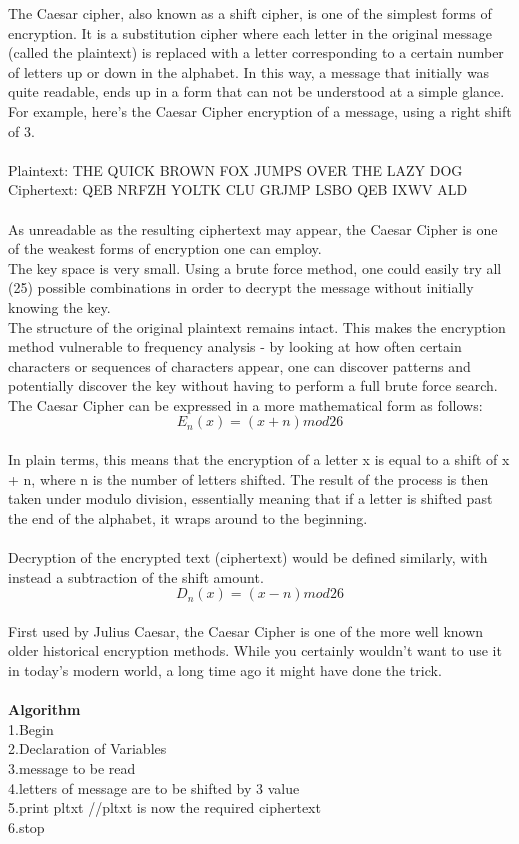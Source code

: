 \documentclass[11pt]{article}
\begin{document}
The Caesar cipher, also known as a shift cipher, is one of the simplest forms of encryption. It is a substitution cipher where each letter in the original message (called the plaintext) is replaced with a letter corresponding to a certain number of letters up or down in the alphabet.
In this way, a message that initially was quite readable, ends up in a form that can not be understood at a simple glance.
For example, here's the Caesar Cipher encryption of a message, using a right shift of 3.
\\
\\
Plaintext:  
THE QUICK BROWN FOX JUMPS OVER THE LAZY DOG
Ciphertext: 
QEB NRFZH YOLTK CLU GRJMP LSBO QEB IXWV ALD
\\
\\
As unreadable as the resulting ciphertext may appear, the Caesar Cipher is one of the weakest forms of encryption one can employ.
\\
The key space is very small. Using a brute force method, one could easily try all (25) possible combinations in order to decrypt the message without initially knowing the key.
\\
The structure of the original plaintext remains intact. This makes the encryption method vulnerable to frequency analysis - by looking at how often certain characters or sequences of characters appear, one can discover patterns and potentially discover the key without having to perform a full brute force search.
\\
The Caesar Cipher can be expressed in a more mathematical form as follows:
$$E_n(x)=(x+n)mod26$$
\\
In plain terms, this means that the encryption of a letter x is equal to a shift of x + n, where n is the number of letters shifted. The result of the process is then taken under modulo division, essentially meaning that if a letter is shifted past the end of the alphabet, it wraps around to the beginning.
\\
\\
Decryption of the encrypted text (ciphertext) would be defined similarly, with instead a subtraction of the shift amount.
\\
$$D_n(x)=(x-n)mod26$$
\\
First used by Julius Caesar, the Caesar Cipher is one of the more well known older historical encryption methods. While you certainly wouldn't want to use it in today's modern world, a long time ago it might have done the trick.
\\
\\
\textbf{Algorithm}
\\
1.Begin\\
2.Declaration of Variables\\
3.message to be read\\
4.letters of message are to be shifted by 3 value\\
5.print pltxt //pltxt is now the required ciphertext\\
6.stop
\end{document}
